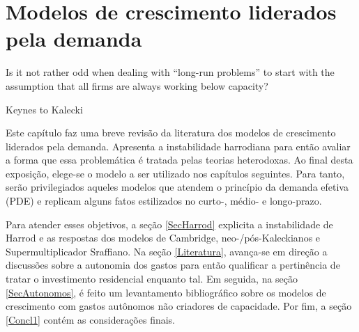 \chapter{Modelos de crescimento liderados pela demanda}
\label{CapTeorico}

\epigraph{Is it not rather odd when dealing with ``long-run problems'' to start with the assumption that all firms are always working below capacity?}{Keynes to Kalecki}


Este capítulo faz uma breve revisão da literatura dos modelos de crescimento liderados pela demanda. Apresenta a instabilidade harrodiana para então avaliar a forma que essa problemática é tratada pelas teorias heterodoxas.
Ao final desta exposição,  elege-se o modelo a ser utilizado nos capítulos seguintes.
Para tanto, serão privilegiados aqueles modelos que atendem o princípio da demanda efetiva (PDE)  e replicam alguns fatos estilizados no curto-, médio- e longo-prazo.

\begin{comment}
mais especificamente:
\begin{itemize}
	\item \textbf{Curto-prazo:} Determinação da poupança pelo investimento \cite{keynes_general_1936};
	\item \textbf{Médio-prazo:} Relação positiva entre taxa de investimento e crescimento \cite{cesaratto_neo-kaleckian_2015};
	\item \textbf{Longo-prazo:} Convergência ao grau de utilização ao normal\footnote{Por grau de utilização normal, adota-se a definição de \textcites[p.~423--4, Original de 1986]{ciccone_2017}: ``\textit{The `normal' utilization of capacity can therefore imply not only the expectation of a certain breadth and frequency of the fluctuations in demand, but also the expectation of the idleness of the excess capacity deliberately chosen by the entrepreneurs;}'' } \cites{ciccone_2017}{vianello_pace_1985}.
\end{itemize}
\end{comment}


Para atender esses objetivos, a seção \ref{SecHarrod} explicita a instabilidade de Harrod e as respostas dos modelos de Cambridge, neo-/pós-Kaleckianos e Supermultiplicador Sraffiano. 
Na seção \ref{Literatura}, avança-se em direção a discussões sobre a autonomia dos gastos para então qualificar a pertinência de tratar o investimento residencial enquanto tal.
Em seguida, na seção \ref{SecAutonomos}, é feito um levantamento bibliográfico sobre os modelos de crescimento com gastos autônomos não criadores de capacidade. 
Por fim, a seção \ref{Concl1} contém as considerações finais.



%
%


